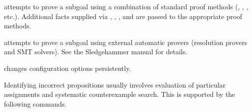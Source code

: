 \begin{isabellebody}
\begin{isamarkuptext}
\begin{description}
  \item \hyperlink{command.HOL.try-methods}{\mbox{}} attempts to prove a subgoal using a combination
    of standard proof methods (, , , etc.).
    Additional facts supplied via , ,
    , and  are passed to the appropriate proof
    methods.

  \item \hyperlink{command.HOL.sledgehammer}{\mbox{}} attempts to prove a subgoal using external
    automatic provers (resolution provers and SMT solvers). See the Sledgehammer
    manual \cite{isabelle-sledgehammer} for details.

  \item \hyperlink{command.HOL.sledgehammer-params}{\mbox{}} changes
    \hyperlink{command.HOL.sledgehammer}{\mbox{}} configuration options persistently.

  \end{description}%
\end{isamarkuptext}%
\isamarkuptrue%
%
\isamarkuptrue%
%
\begin{isamarkuptext}%
Identifying incorrect propositions usually involves evaluation of
  particular assignments and systematic counterexample search.  This
  is supported by the following commands.


\end{isamarkuptext}
\end{isabellebody}
